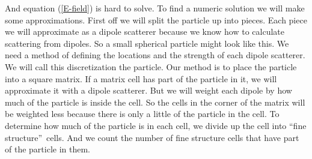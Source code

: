 \documentclass{article}
\begin{document}
And equation (\ref{E-field}) is hard to solve. To find a numeric solution we
will make some approximations. First off we will split the particle up into
pieces. Each piece we will approximate as a dipole scatterer because we know
how to calculate scattering from dipoles. So a small spherical particle
might look like this. We need a method of defining the
locations and the strength of each dipole scatterer. We will call this
discretization the particle. Our method is to place the particle into a
square matrix. If a matrix cell has part of the
particle in it, we will approximate it with a dipole scatterer. But we will
weight each dipole by how much of the particle is inside the cell. So the
cells in the corner of the matrix will be weighted less because there is
only a little of the particle in the cell. To determine how much of the
particle is in each cell, we divide up the cell into \textquotedblleft fine
structure\textquotedblright\ cells. And we count the number of fine
structure cells that have part of the particle in them. 

\end{document}
